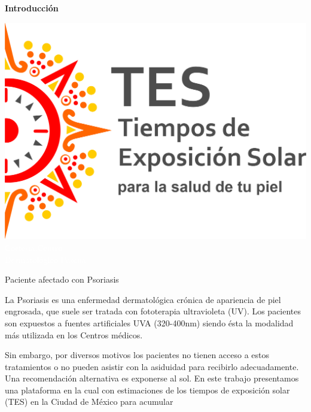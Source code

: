 \documentclass{article}
\begin{document}
\begin{multicols}{2}
\changefontsizes{13pt}
\begin{center}
\begin{shaded}
\textbf{\textcolor{na}{Introducción}}
\end{shaded}
\end{center}
\begin{minipage}{0.4\linewidth}
\includegraphics[scale=0.35]{images/TES.png}
\vspace{-0.6cm}\\
\changefontsizes{0.5pt}
\textcolor{white}{Cortesía:Centro \\Dermatológico Pascua}
\begin{center}
\changefontsizes{10pt}
\vspace{0.6cm}
\textcolor{na}{Paciente afectado con Psoriasis}
\end{center}
\end{minipage}
\hspace{-0.cm}
\begin{minipage}{0.6\linewidth}
La Psoriasis es una enfermedad dermatológica crónica de apariencia de piel engrosada, que suele ser 
tratada con fototerapia ultravioleta (UV). Los pacientes son expuestos a fuentes artificiales UVA (320-400nm) 
siendo ésta la modalidad más utilizada en los Centros médicos. 
\end{minipage}
Sin embargo, por diversos motivos los pacientes no tienen acceso a estos tratamientos o no pueden asistir con 
la asiduidad para recibirlo adecuadamente. Una recomendación alternativa es exponerse al sol. En este trabajo presentamos 
una plataforma en la cual con estimaciones de los tiempos de  exposición solar (TES)  en la Ciudad de México para acumular 

\end{multicols}
\end{document}
